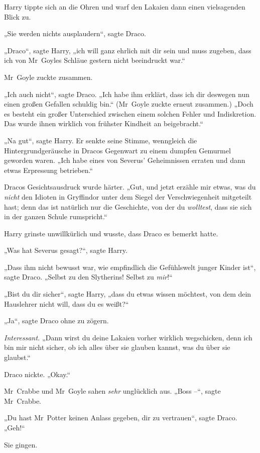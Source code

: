 {Harry tippte sich an die Ohren und warf den Lakaien dann einen vielsagenden Blick zu.

„Sie werden nichts ausplaudern“, sagte Draco.

„Draco“, sagte Harry, „ich will ganz ehrlich mit dir sein und muss zugeben, dass ich von Mr~Goyles Schläue gestern nicht beeindruckt war.“

Mr~Goyle zuckte zusammen.

„Ich auch nicht“, sagte Draco. „Ich habe ihm erklärt, dass ich dir deswegen nun einen großen Gefallen schuldig bin.“ (Mr~Goyle zuckte erneut zusammen.) „Doch es besteht ein großer Unterschied zwischen einem solchen Fehler und Indiskretion. Das wurde ihnen wirklich von frühster Kindheit an beigebracht.“

„Na gut“, sagte Harry. Er senkte seine Stimme, wenngleich die Hintergrundgeräusche in Dracos Gegenwart zu einem dumpfen Gemurmel geworden waren. „Ich habe eines von Severus' Geheimnissen erraten und dann etwas Erpressung betrieben.“

Dracos Gesichtsausdruck wurde härter. „Gut, und jetzt erzähle mir etwas, was du \emph{nicht} den Idioten in Gryffindor unter dem Siegel der Verschwiegenheit mitgeteilt hast; denn das ist natürlich nur die Geschichte, von der du \emph{wolltest}, dass sie sich in der ganzen Schule rumspricht.“

Harry grinste unwillkürlich und wusste, dass Draco es bemerkt hatte.

„Was hat Severus gesagt?“, sagte Harry.

„Dass ihm nicht bewusst war, wie empfindlich die Gefühlswelt junger Kinder ist“, sagte Draco. „Selbst zu den Slytherins! Selbst zu \emph{mir}!“

„Bist du dir sicher“, sagte Harry, „dass du etwas wissen möchtest, von dem dein Hauslehrer nicht will, dass du es weißt?“

„Ja“, sagte Draco ohne zu zögern.

\emph{Interessant.} „Dann wirst du deine Lakaien vorher wirklich wegschicken, denn ich bin mir nicht sicher, ob ich alles über sie glauben kannst, was du über sie glaubst.“

Draco nickte. „Okay.“

Mr~Crabbe und Mr~Goyle sahen \emph{sehr} unglücklich aus. „Boss --“, sagte Mr~Crabbe.

„Du hast Mr~Potter keinen Anlass gegeben, dir zu vertrauen“, sagte Draco. „Geh!“

Sie gingen.

}
